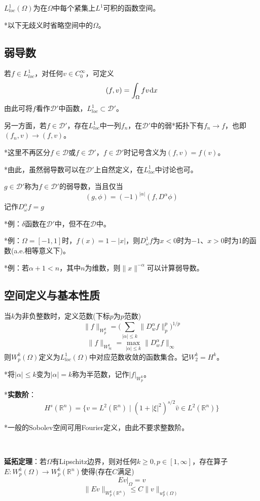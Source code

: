 \documentclass[a4paper,UTF8,fontset=windows]{ctexart}
\newcommand*{\dr}{\hspace{0.07em}\mathrm{d}}
\newcommand*{\cd}{\mathcal{D}}
\begin{document}
$L^1_{loc}(\Omega)$为在$\Omega$中每个紧集上$L^1$可积的函数空间。

*以下无歧义时省略空间中的$\Omega$。

\subsection{弱导数}
若$f\in L_{loc}^1$，对任何$v\in C_0^\infty$，可定义
$$(f,v)=\int_\Omega fv\dr x$$
由此可将$f$看作$\cd'$中函数，$L^1_{loc}\subset\cd'$。

另一方面，若$f\in\cd'$，存在$L^1_{loc}$中一列$f_n$，在$\cd'$中的弱*拓扑下有$f_n\to f$，也即$(f_n,v)\to(f,v)$。

*这里不再区分$f\in\cd$或$f\in\cd'$，$f\in\cd'$时记号含义为$(f,v)=f(v)$。

*由此，虽然弱导数可以在$\cd'$上自然定义，在$L^1_{loc}$中讨论也可。

$g\in\cd'$称为$f\in\cd'$的弱导数，当且仅当
$$(g,\phi)=(-1)^{|\alpha|}(f,D^\alpha\phi)$$
记作$D_\omega^\alpha f=g$

*例：$\delta$函数在$\cd'$中，但不在$\cd$中。

*例：$\Omega=[-1,1]$时，$f(x)=1-|x|$，则$D_\omega^1f$为$x<0$时为$-1$、$x>0$时为1的函数(a.e.相等意义下)。

*例：若$\alpha+1<n$，其中$n$为维数，则$\|x\|^{-\alpha}$可以计算弱导数。

\subsection{空间定义与基本性质}
当$k$为非负整数时，定义范数(下标$p$为$p$范数)
$$\|f\|_{W_p^k}=\bigg(\sum_{|\alpha|\le k}\|D_w^\alpha f\|_p^p\bigg)^{1/p}$$
$$\|f\|_{W_\infty^k}=\max_{|\alpha|\le k}\|D_w^\alpha f\|_\infty$$
则$W_p^k(\Omega)$定义为$L_{loc}^1(\Omega)$中对应范数收敛的函数集合。记$W_2^k=H^k$。

*将$|\alpha|\le k$变为$|\alpha|=k$称为半范数，记作$|f|_{W_p^k}$。

*\textbf{实数阶}：
$$H^s(\mathbb{R}^n)=\{v=L^2(\mathbb{R}^n)\mid(1+|\xi|^2)^{s/2}\hat{v}\in L^2(\mathbb{R}^n)\}$$

*一般的Sobolev空间可用Fourier定义，由此不要求整数阶。

\

\textbf{延拓定理}：若$\Omega$有Lipschitz边界，则对任何$k\ge0,p\in[1,\infty]$，存在算子$E:W_p^k(\Omega)\to W_p^k(\mathbb{R}^n)$使得(存在$C$满足)
$$Ev\big|_\Omega=v$$
$$\|Ev\|_{W_p^k(\mathbb{R}^n)}\le C\|v\|_{w_p^k(\Omega)}$$

\
\end{document}
